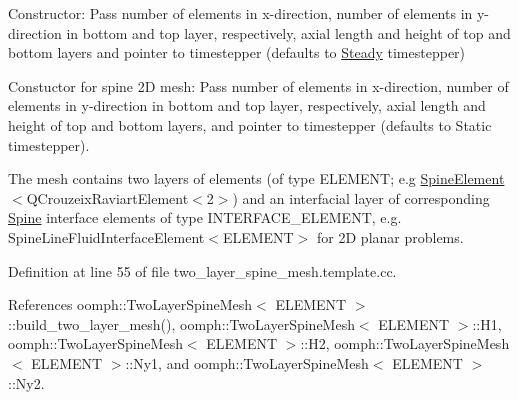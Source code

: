 Constructor\+: Pass number of elements in x-\/direction, number of elements in y-\/direction in bottom and top layer, respectively, axial length and height of top and bottom layers and pointer to timestepper (defaults to \hyperlink{classoomph_1_1Steady}{Steady} timestepper) 

Constuctor for spine 2D mesh\+: Pass number of elements in x-\/direction, number of elements in y-\/direction in bottom and top layer, respectively, axial length and height of top and bottom layers, and pointer to timestepper (defaults to Static timestepper).

The mesh contains two layers of elements (of type E\+L\+E\+M\+E\+NT; e.\+g \hyperlink{classoomph_1_1SpineElement}{Spine\+Element}$<$Q\+Crouzeix\+Raviart\+Element$<$2$>$) and an interfacial layer of corresponding \hyperlink{classoomph_1_1Spine}{Spine} interface elements of type I\+N\+T\+E\+R\+F\+A\+C\+E\+\_\+\+E\+L\+E\+M\+E\+NT, e.\+g. Spine\+Line\+Fluid\+Interface\+Element$<$\+E\+L\+E\+M\+E\+N\+T$>$ for 2D planar problems. 

Definition at line 55 of file two\+\_\+layer\+\_\+spine\+\_\+mesh.\+template.\+cc.



References oomph\+::\+Two\+Layer\+Spine\+Mesh$<$ E\+L\+E\+M\+E\+N\+T $>$\+::build\+\_\+two\+\_\+layer\+\_\+mesh(), oomph\+::\+Two\+Layer\+Spine\+Mesh$<$ E\+L\+E\+M\+E\+N\+T $>$\+::\+H1, oomph\+::\+Two\+Layer\+Spine\+Mesh$<$ E\+L\+E\+M\+E\+N\+T $>$\+::\+H2, oomph\+::\+Two\+Layer\+Spine\+Mesh$<$ E\+L\+E\+M\+E\+N\+T $>$\+::\+Ny1, and oomph\+::\+Two\+Layer\+Spine\+Mesh$<$ E\+L\+E\+M\+E\+N\+T $>$\+::\+Ny2.

\mbox{\label{classoomph_1_1TwoLayerSpineMesh_a8787a305ee929d001542464529e23787}} 
